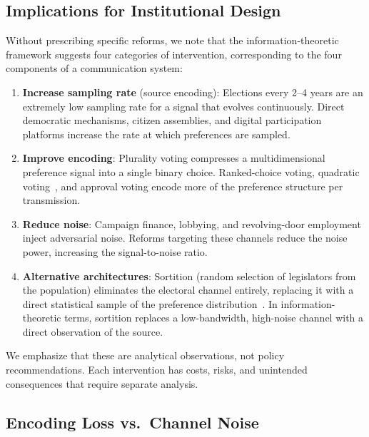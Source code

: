 \documentclass[twocolumn,10pt]{article}
\begin{document}
\subsection{Implications for Institutional Design}

Without prescribing specific reforms, we note that the information-theoretic framework suggests four categories of intervention, corresponding to the four components of a communication system:

\begin{enumerate}
\item \textbf{Increase sampling rate} (source encoding): Elections every 2--4 years are an extremely low sampling rate for a signal that evolves continuously.  Direct democratic mechanisms, citizen assemblies, and digital participation platforms increase the rate at which preferences are sampled.

\item \textbf{Improve encoding}: Plurality voting compresses a multidimensional preference signal into a single binary choice.  Ranked-choice voting, quadratic voting~\citep{posner2018}, and approval voting encode more of the preference structure per transmission.

\item \textbf{Reduce noise}: Campaign finance, lobbying, and revolving-door employment inject adversarial noise.  Reforms targeting these channels reduce the noise power, increasing the signal-to-noise ratio.

\item \textbf{Alternative architectures}: Sortition (random selection of legislators from the population) eliminates the electoral channel entirely, replacing it with a direct statistical sample of the preference distribution~\citep{manin1997,landemore2012,guerrero2014}.  In information-theoretic terms, sortition replaces a low-bandwidth, high-noise channel with a direct observation of the source.
\end{enumerate}

We emphasize that these are analytical observations, not policy recommendations.  Each intervention has costs, risks, and unintended consequences that require separate analysis.

\subsection{Encoding Loss vs.\ Channel Noise}
\end{document}
